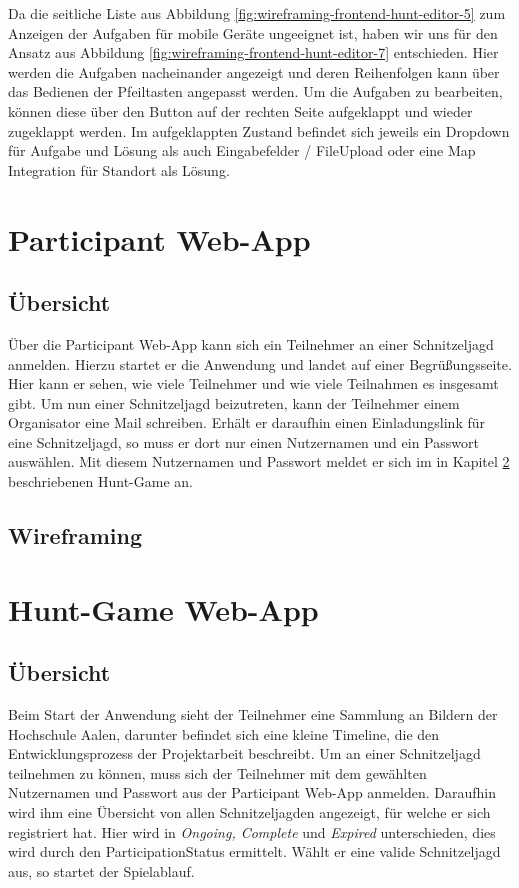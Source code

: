 Da die seitliche Liste aus Abbildung \ref{fig:wireframing-frontend-hunt-editor-5} zum Anzeigen der Aufgaben für mobile Geräte ungeeignet ist, haben wir uns für den Ansatz aus Abbildung \ref{fig:wireframing-frontend-hunt-editor-7} entschieden. Hier werden die Aufgaben nacheinander angezeigt und deren Reihenfolgen kann über das Bedienen der Pfeiltasten angepasst werden. Um die Aufgaben zu bearbeiten, können diese über den Button auf der rechten Seite aufgeklappt und wieder zugeklappt werden. Im aufgeklappten Zustand befindet sich jeweils ein Dropdown für Aufgabe und Lösung als auch Eingabefelder / FileUpload oder eine Map Integration für Standort als Lösung. 

\section{Participant Web-App}

\subsection{Übersicht}

Über die Participant Web-App kann sich ein Teilnehmer an einer Schnitzeljagd anmelden. Hierzu startet er die Anwendung und landet auf einer Begrüßungsseite. Hier kann er sehen, wie viele Teilnehmer und wie viele Teilnahmen es insgesamt gibt. Um nun einer Schnitzeljagd beizutreten, kann der Teilnehmer einem Organisator eine Mail schreiben. Erhält er daraufhin einen Einladungslink für eine Schnitzeljagd, so muss er dort nur einen Nutzernamen und ein Passwort auswählen. Mit diesem Nutzernamen und Passwort meldet er sich im in Kapitel \ref{subsec:swentwurf:hunt-game} beschriebenen Hunt-Game an.

\subsection{Wireframing}

\section{Hunt-Game Web-App} \label{subsec:swentwurf:hunt-game}

\subsection{Übersicht}
Beim Start der Anwendung sieht der Teilnehmer eine Sammlung an Bildern der Hochschule Aalen, darunter befindet sich eine kleine Timeline, die den Entwicklungsprozess der Projektarbeit beschreibt. Um an einer Schnitzeljagd teilnehmen zu können, muss sich der Teilnehmer mit dem gewählten Nutzernamen und Passwort aus der Participant Web-App anmelden. Daraufhin wird ihm eine Übersicht von allen Schnitzeljagden angezeigt, für welche er sich registriert hat. Hier wird in \textit{Ongoing, Complete} und \textit{Expired} unterschieden, dies wird durch den ParticipationStatus ermittelt. Wählt er eine valide Schnitzeljagd aus, so startet der Spielablauf. 


